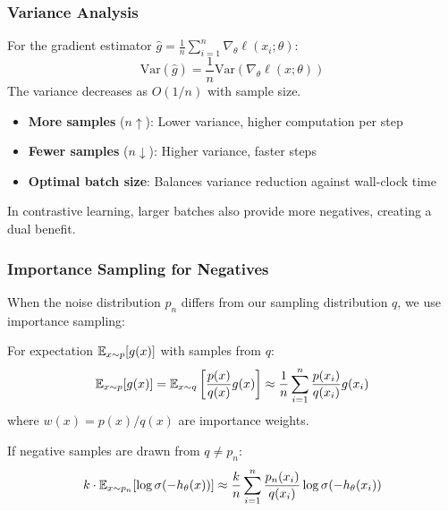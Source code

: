 \begin{notechapter}
\subsubsection{Variance Analysis}

\begin{proposition}
\label{contrastive-rigorous:prop:mc_variance}
For the gradient estimator $\hat{g} = \frac{1}{n}\sum_{i=1}^n \nabla_\theta \ell(x_i; \theta)$:
\begin{equation}
\text{Var}(\hat{g}) = \frac{1}{n} \text{Var}(\nabla_\theta \ell(x; \theta))
\end{equation}
The variance decreases as $O(1/n)$ with sample size.
\end{proposition}

\begin{intuition}
\begin{itemize}
    \item \textbf{More samples} ($n \uparrow$): Lower variance, higher computation per step
    \item \textbf{Fewer samples} ($n \downarrow$): Higher variance, faster steps
    \item \textbf{Optimal batch size}: Balances variance reduction against wall-clock time
\end{itemize}
In contrastive learning, larger batches also provide more negatives, creating a dual benefit.
\end{intuition}

\subsubsection{Importance Sampling for Negatives}

When the noise distribution $p_n$ differs from our sampling distribution $q$, we use importance sampling:

\begin{definition}
For expectation $\mathbb{E}_{x \sim p}[g(x)]$ with samples from $q$:
\begin{equation}
\mathbb{E}_{x \sim p}[g(x)] = \mathbb{E}_{x \sim q}\left[\frac{p(x)}{q(x)} g(x)\right] \approx \frac{1}{n} \sum_{i=1}^{n} \frac{p(x_i)}{q(x_i)} g(x_i)
\end{equation}
where $w(x) = p(x)/q(x)$ are importance weights.
\end{definition}

\begin{proposition}
If negative samples are drawn from $q \neq p_n$:
\begin{equation}
k \cdot \mathbb{E}_{x \sim p_n}[\log \sigma(-h_\theta(x))] \approx \frac{k}{n} \sum_{i=1}^{n} \frac{p_n(x_i)}{q(x_i)} \log \sigma(-h_\theta(x_i))
\end{equation}
\end{proposition}


\end{notechapter}
